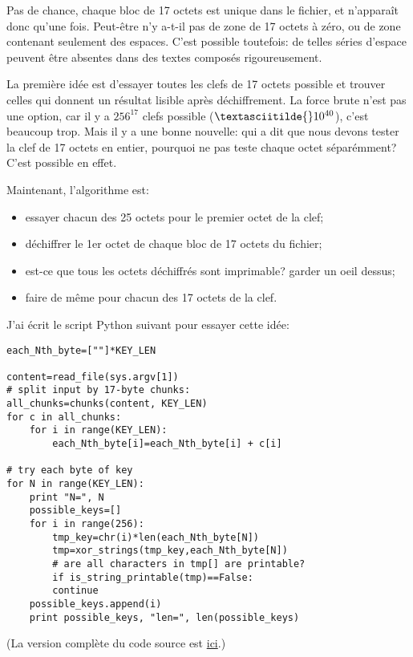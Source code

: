 Pas de chance, chaque bloc de 17 octets est unique dans le fichier, et n'apparaît
donc qu'une fois.
Peut-être n'y a-t-il pas de zone de 17 octets à zéro, ou de zone contenant seulement
des espaces.
C'est possible toutefois: de telles séries d'espace peuvent être absentes dans des
textes composés rigoureusement.

La première idée est d'essayer toutes les clefs de 17 octets possible et trouver
celles qui donnent un résultat lisible après déchiffrement.
La force brute n'est pas une option, car il y a $256^{17}$ clefs possible ($\textasciitilde{}10^{40}$),
c'est beaucoup trop.
Mais il y a une bonne nouvelle: qui a dit que nous devons tester la clef de 17 octets
en entier, pourquoi ne pas teste chaque octet séparémment?
C'est possible en effet.

Maintenant, l'algorithme est:

\begin{itemize}
\item essayer chacun des 25 octets pour le premier octet de la clef;
\item déchiffrer le 1er octet de chaque bloc de 17 octets du fichier;
\item est-ce que tous les octets déchiffrés sont imprimable? garder un oeil dessus;
\item faire de même pour chacun des 17 octets de la clef.
\end{itemize}

J'ai écrit le script Python suivant pour essayer cette idée:

\begin{lstlisting}[caption=Python script,style=custompy]
each_Nth_byte=[""]*KEY_LEN

content=read_file(sys.argv[1])
# split input by 17-byte chunks:
all_chunks=chunks(content, KEY_LEN)
for c in all_chunks:
    for i in range(KEY_LEN):
        each_Nth_byte[i]=each_Nth_byte[i] + c[i]

# try each byte of key
for N in range(KEY_LEN):
    print "N=", N
    possible_keys=[]
    for i in range(256):
        tmp_key=chr(i)*len(each_Nth_byte[N])
        tmp=xor_strings(tmp_key,each_Nth_byte[N])
        # are all characters in tmp[] are printable?
        if is_string_printable(tmp)==False:
	    continue
	possible_keys.append(i)
    print possible_keys, "len=", len(possible_keys)
\end{lstlisting}

(La version complète du code source est
 \href{https://github.com/DennisYurichev/RE-for-beginners/blob/master/ff/XOR/mask_2/files/decrypt2.py}{ici}.)

